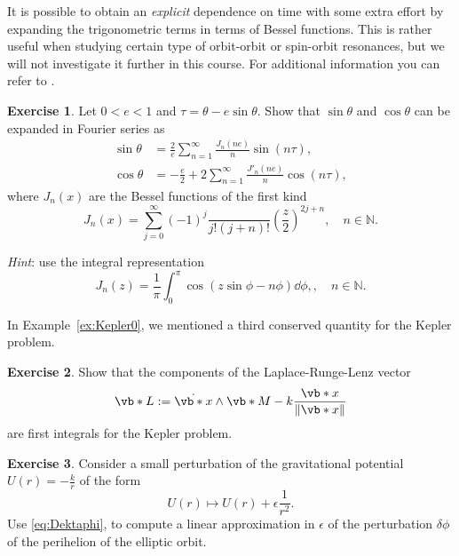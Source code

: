 \documentclass[english,fontsize=11pt,paper=b5]{scrbook}
\theoremstyle{definition}
\newtheorem{exercise}{Exercise}[chapter]
\begin{document}
    It is possible to obtain an \emph{explicit} dependence on time with some extra effort by expanding the trigonometric terms in terms of Bessel functions. This is rather useful when studying certain type of orbit-orbit or spin-orbit resonances, but we will not investigate it further in this course. For additional information you can refer to \cite{book:arnoldcelestial, book:celletti}.

    \begin{exercise}
      Let $0<e<1$ and $\tau = \theta - e\sin\theta$.
      Show that $\sin\theta$ and $\cos\theta$ can be expanded in Fourier series as
      \begin{align}
        \sin\theta & = \frac2e \sum_{n=1}^\infty \frac{J_n(ne)}{n} \sin(n\tau),        \\
        \cos\theta & = -\frac e2 + 2 \sum_{n=1}^\infty \frac{J'_n(ne)}{n} \cos(n\tau),
      \end{align}
      where $J_n(x)$ are the Bessel functions of the first kind
      \begin{equation}
        J_n(x) = \sum_{j=0}^\infty (-1)^j\frac{}{j!(j+n)!}\left(\frac z2\right)^{2j+n}, \quad n\in\mathbb{N}.
      \end{equation}

      \emph{Hint}: use the integral representation
      \begin{equation}
        J_n(z) = \frac1\pi \int_0^\pi \cos\left(z\sin\phi - n \phi\right)\dd\phi,, \quad n\in\mathbb{N}.
      \end{equation}
    \end{exercise}

    In Example~\ref{ex:Kepler0}, we mentioned a third conserved quantity for the Kepler problem.
    \begin{exercise}
      Show that the components of the Laplace-Runge-Lenz vector
      \begin{equation}
        \vb*{L} := \dot{\vb*{x}}\wedge \vb*{M} - k \frac{\vb*{x}}{\|\vb*{x}\|}
      \end{equation}
      are first integrals for the Kepler problem.
    \end{exercise}

    \begin{exercise}
      Consider a small perturbation of the gravitational potential $U(r) = -\frac kr$ of the form
      \begin{equation}
        U(r) \mapsto U(r) + \epsilon \frac 1{r^2}.
      \end{equation}
      Use \eqref{eq:Dektaphi}, to compute a linear approximation in $\epsilon$ of the perturbation $\delta \phi$ of the perihelion of the elliptic orbit.
    \end{exercise}
\end{document}
